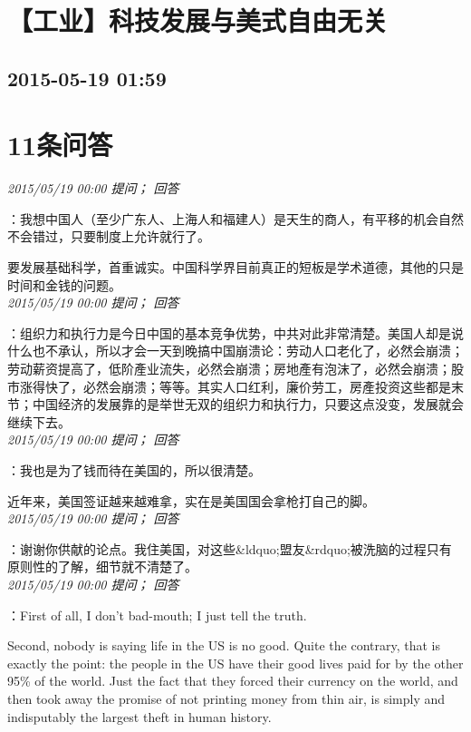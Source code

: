 \documentclass[twocolumn]{ctexart}
\begin{document}
\section{【工业】科技发展与美式自由无关}
\subsection{2015-05-19 01:59}


\section{11条问答}

\textit{\hfill\noindent\small 2015/05/19 00:00 提问； 回答}

：我想中国人（至少广东人、上海人和福建人）是天生的商人，有平移的机会自然不会错过，只要制度上允许就行了。

要发展基础科学，首重诚实。中国科学界目前真正的短板是学术道德，其他的只是时间和金钱的问题。\\

\textit{\hfill\noindent\small 2015/05/19 00:00 提问； 回答}

：组织力和执行力是今日中国的基本竞争优势，中共对此非常清楚。美国人却是说什么也不承认，所以才会一天到晚搞中国崩溃论：劳动人口老化了，必然会崩溃；劳动薪资提高了，低阶產业流失，必然会崩溃；房地產有泡沫了，必然会崩溃；股市涨得快了，必然会崩溃；等等。其实人口红利，廉价劳工，房產投资这些都是末节；中国经济的发展靠的是举世无双的组织力和执行力，只要这点没变，发展就会继续下去。\\

\textit{\hfill\noindent\small 2015/05/19 00:00 提问； 回答}

：我也是为了钱而待在美国的，所以很清楚。

近年来，美国签证越来越难拿，实在是美国国会拿枪打自己的脚。\\

\textit{\hfill\noindent\small 2015/05/19 00:00 提问； 回答}

：谢谢你供献的论点。我住美国，对这些\&ldquo;盟友\&rdquo;被洗脑的过程只有原则性的了解，细节就不清楚了。\\

\textit{\hfill\noindent\small 2015/05/19 00:00 提问； 回答}

：First of all, I don't bad-mouth; I just tell the truth.

Second, nobody is saying life in the US is no good. Quite the contrary, that is exactly the point: the people in the US have their good lives paid for by the other 95\% of the world. Just the fact that they forced their currency on the world, and then took away the promise of not printing money from thin air, is simply and indisputably the largest theft in human history. 
\end{document}
